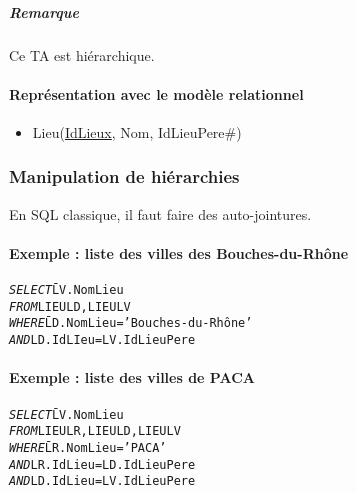 \documentclass[10pt]{article}
\begin{document}
					\subparagraph{Remarque} Ce TA est hiérarchique.
					
				\paragraph{Représentation avec le modèle relationnel}
					\begin{itemize}
						\item Lieu(\underline{IdLieux}, Nom, IdLieuPere\#)
					\end{itemize}
					
			\subsubsection{Manipulation de hiérarchies}
				En SQL classique, il faut faire des auto-jointures.
				
				\paragraph{Exemple : liste des villes des Bouches-du-Rhône}
					\begin{alltt}
						\begin{tabbing}
							\emph{SELECT} \= LV.NomLieu\\
							\emph{FROM} \> LIEU LD, LIEU LV\\
							\emph{WHERE} \> \=LD.NomLieu='Bouches-du-Rhône'\\
										\>\>\emph{AND} LD.IdLIeu=LV.IdLieuPere
						\end{tabbing}
					\end{alltt}
					
				\paragraph{Exemple : liste des villes de PACA}
					\begin{alltt}
						\begin{tabbing}
							\emph{SELECT} \= LV.NomLieu\\
							\emph{FROM} \> LIEU LR, LIEU LD, LIEU LV\\
							\emph{WHERE} \> \=LR.NomLieu='PACA'\\
										\>\>\emph{AND} LR.IdLieu=LD.IdLieuPere\\
										\>\>\emph{AND} LD.IdLieu=LV.IdLieuPere\\
						\end{tabbing}
					\end{alltt}
					
\end{document}
